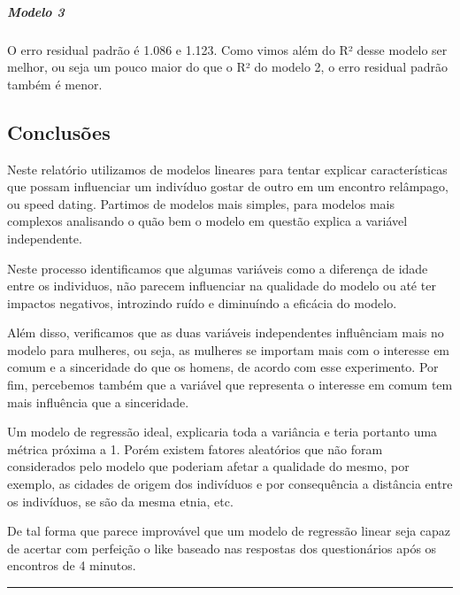 \documentclass[]{article}
\let\oldsubparagraph\subparagraph
\renewcommand{\subparagraph}[1]{\oldsubparagraph{#1}\mbox{}}
\begin{document}
\hypertarget{modelo-3-2}{%
\subparagraph{Modelo 3}\label{modelo-3-2}}

O erro residual padrão é 1.086 e 1.123. Como vimos além do R² desse
modelo ser melhor, ou seja um pouco maior do que o R² do modelo 2, o
erro residual padrão também é menor.

\hypertarget{conclusuxf5es}{%
\subsection{Conclusões}\label{conclusuxf5es}}

Neste relatório utilizamos de modelos lineares para tentar explicar
características que possam influenciar um indivíduo gostar de outro em
um encontro relâmpago, ou speed dating. Partimos de modelos mais
simples, para modelos mais complexos analisando o quão bem o modelo em
questão explica a variável independente.

Neste processo identificamos que algumas variáveis como a diferença de
idade entre os individuos, não parecem influenciar na qualidade do
modelo ou até ter impactos negativos, introzindo ruído e diminuíndo a
eficácia do modelo.

Além disso, verificamos que as duas variáveis independentes influênciam
mais no modelo para mulheres, ou seja, as mulheres se importam mais com
o interesse em comum e a sinceridade do que os homens, de acordo com
esse experimento. Por fim, percebemos também que a variável que
representa o interesse em comum tem mais influência que a sinceridade.

Um modelo de regressão ideal, explicaria toda a variância e teria
portanto uma métrica próxima a 1. Porém existem fatores aleatórios que
não foram considerados pelo modelo que poderiam afetar a qualidade do
mesmo, por exemplo, as cidades de origem dos indivíduos e por
consequência a distância entre os indivíduos, se são da mesma etnia,
etc.

De tal forma que parece improvável que um modelo de regressão linear
seja capaz de acertar com perfeição o like baseado nas respostas dos
questionários após os encontros de 4 minutos.

\begin{center}\rule{0.5\linewidth}{\linethickness}\end{center}
\end{document}
